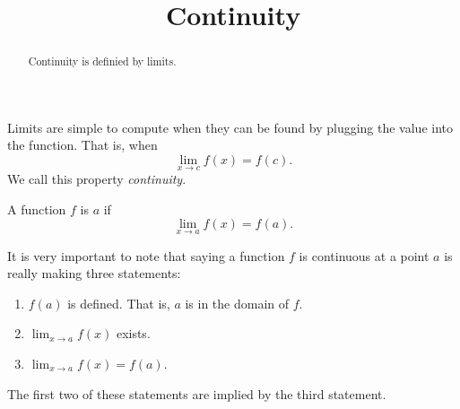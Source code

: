 \documentclass{ximera}
\title[Dig-In:]{Continuity}
\begin{document}
\begin{abstract}
Continuity is definied by limits. 
\end{abstract}
\maketitle




Limits are simple to compute when they can be found by plugging the
value into the function.  That is, when
\[
\lim_{x\to c}f(x) = f(c).
\]
We call this property \textit{continuity}.

\begin{definition}
  A function $f$ is  $a$ if
  \[
  \lim_{x\to a}f(x) = f(a).
  \]
\end{definition}


It is very important to note that saying a function $f$ is continuous
at a point $a$ is really making three statements:
\begin{enumerate}
\item $f(a)$ is defined.  That is, $a$ is in the domain of $f$.
\item $\lim_{x\to a}f(x)$ exists.
\item $\lim_{x\to a} f(x) = f(a)$.
\end{enumerate}

The first two of these statements are implied by the third statement.
\end{document}
